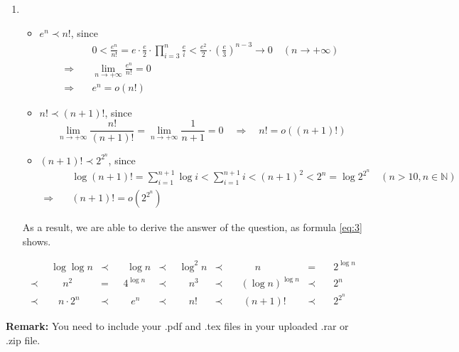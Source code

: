 \documentclass[12pt,a4paper]{article}
\makeatletter
\newtheorem*{solution}{Solution}
\theoremstyle{definition}
\renewenvironment{solution}[1][Solution] {\par\pushQED{\qed}\normalfont\topsep6\p@\@plus6\p@\relax\trivlist\item[\hskip\labelsep\bfseries#1\@addpunct{.}]\ignorespaces}{\popQED\endtrivlist\@endpefalse} \makeatother
\makeatother
\begin{document}
\begin{enumerate}
\begin{solution}
\begin{itemize}
        \item $e^n \prec n!$, since
            \begin{displaymath}
            \begin{aligned}
                & \quad 0 < \frac{e^n}{n!} = e \cdot \frac{e}{2} \cdot \prod_{i=3}^n \frac{e}{i} < \frac{e^2}{2} \cdot \left(\frac{e}{3}\right)^{n-3} \longrightarrow 0 \quad (n\rightarrow +\infty) \\
                \Longrightarrow & \quad \lim_{n\rightarrow +\infty} \frac{e^n}{n!} = 0 \\
                \Longrightarrow & \quad e^n = o(n!)
            \end{aligned}
            \end{displaymath}
        \item $n! \prec (n+1)!$, since
            \begin{displaymath}
            \lim_{n \rightarrow +\infty} \frac{n!}{(n+1)!} = \lim_{n \rightarrow +\infty} \frac{1}{n+1} = 0 \quad \Longrightarrow \quad n! = o((n+1)!)
            \end{displaymath}
        \item $(n+1)! \prec 2^{2^n}$, since
            \begin{displaymath}
            \begin{aligned}
            & \quad \log{(n+1)!} = \sum_{i=1}^{n+1} \log{i} < \sum_{i=1}^{n+1} i < (n+1)^2 < 2^n = \log{2^{2^n}} \quad (n > 10, n \in \mathbb{N})\\
            \Longrightarrow & \quad (n+1)! = o(2^{2^n})
            \end{aligned}
            \end{displaymath}
        \end{itemize}

        As a result, we are able to derive the answer of the question, as formula \eqref{eq:3} shows.

        \begin{equation}
        \begin{aligned}
                  & \ \ \log{\log{n}}   & \prec & \quad \log{n}    & \prec & \ \ \log^2{n} & \prec & \quad \quad \ \ n           &   =   & \quad 2^{\log{n}} \\
            \prec & \quad \ \ \ n^2     &   =   & \ \ \ 4^{\log{n}}& \prec & \quad \ \ n^3 & \prec & \quad (\log{n})^{\log{n}}   & \prec & \quad 2^n  \\
            \prec & \quad \ n \cdot 2^n & \prec & \quad \ \ e^n    & \prec & \quad \ \ n!  & \prec & \quad \ (n+1)!              & \prec & \quad 2^{2^n}
        \end{aligned}
        \label{eq:3}
        \end{equation}
    \end{solution}

\end{enumerate}

\vspace{20pt}

\textbf{Remark:} You need to include your .pdf and .tex files in your uploaded .rar or .zip file.

\end{document}
